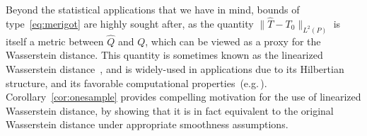 Beyond the statistical applications
that we have in mind, 
bounds of type~\eqref{eq:merigot} are highly sought after, as
the quantity $\|\hat T-T_0\|_{L^2(P)}$
is itself a metric between
$\hat Q$ and $Q$, which can be viewed as a proxy
for the Wasserstein distance. 
This quantity is sometimes
known as the linearized Wasserstein distance~\citep{wang2013linear},
and is widely-used in applications
due to its Hilbertian structure, and  its favorable computational properties~(e.g.\,\cite{cai2020linearized}). 
Corollary~\ref{cor:onesample} provides 
compelling motivation for the use of 
linearized Wasserstein distance, by showing
that it is in fact equivalent to the
original Wasserstein distance
under appropriate smoothness assumptions.